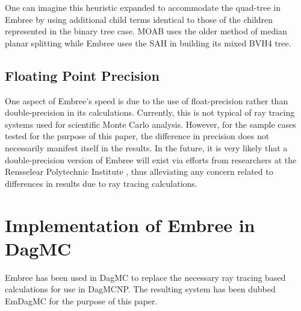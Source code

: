\documentclass{anstrans}
\begin{document}


One can imagine this heuristic expanded to accommodate the quad-tree in Embree by using additional child terms identical to those of the children represented in the binary tree case. MOAB uses the older method of median planar splitting while Embree uses the SAH in building its mixed BVH4 tree. 

\subsection{Floating Point Precision}

One aspect of Embree's speed is due to the use of float-precision rather than double-precision in its calculations. Currently, this is not typical of ray tracing systems used for scientific Monte Carlo analysis. However, for the sample cases tested for the purpose of this paper, the difference in precision does not necessarily manifest itself in the results. In the future, it is very likely that a double-precision version of Embree will exist via efforts from researchers at the Rensselear Polytechnic Institute \cite{gpu_mic_ray_tracing_rpi}, thus alleviating any concern related to differences in results due to ray tracing calculations.

\section{Implementation of Embree in DagMC}

Embree has been used in DagMC to replace the necessary ray tracing based calculations for use in DagMCNP. The resulting system has been dubbed EmDagMC for the purpose of this paper. 
\end{document}
